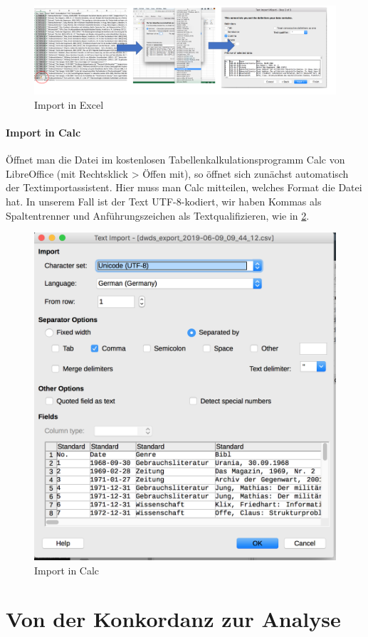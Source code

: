 \documentclass[]{article}
\let\oldparagraph\paragraph
\renewcommand{\paragraph}[1]{\oldparagraph{#1}\mbox{}}
\begin{document}
\begin{figure}
\includegraphics[width=6.66in]{fig/import_in_excel} \caption{Import in Excel}\label{fig:importexcel}
\end{figure}

\hypertarget{import-in-calc}{\paragraph{Import in
Calc}\label{import-in-calc}}

Öffnet man die Datei im kostenlosen Tabellenkalkulationsprogramm Calc
von LibreOffice (mit Rechtsklick \textgreater{} Öffen mit), so öffnet
sich zunächst automatisch der Textimportassistent. Hier muss man Calc
mitteilen, welches Format die Datei hat. In unserem Fall ist der Text
UTF-8-kodiert, wir haben Kommas als Spaltentrenner und Anführungszeichen
als Textqualifizieren, wie in \ref{fig:calcimport}.

\begin{figure}
\includegraphics[width=0.5\linewidth,height=0.5\textheight]{fig/calc_import} \caption{Import in Calc}\label{fig:calcimport}
\end{figure}

\section{Von der Konkordanz zur
Analyse}\label{von-der-konkordanz-zur-analyse}
\end{document}
